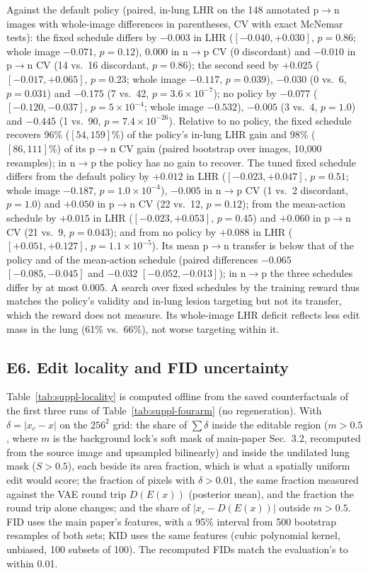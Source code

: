 Against the default policy (paired, in-lung LHR on the 148 annotated p$\to$n images with whole-image differences in parentheses, CV with exact McNemar tests): the fixed schedule differs by $-0.003$ in LHR ($[-0.040, +0.030]$, $p=0.86$; whole image $-0.071$, $p=0.12$), $0.000$ in n$\to$p CV (0 discordant) and $-0.010$ in p$\to$n CV (14 vs.\ 16 discordant, $p=0.86$); the second seed by $+0.025$ ($[-0.017, +0.065]$, $p=0.23$; whole image $-0.117$, $p=0.039$), $-0.030$ (0 vs.\ 6, $p=0.031$) and $-0.175$ (7 vs.\ 42, $p=3.6\times10^{-7}$); no policy by $-0.077$ ($[-0.120, -0.037]$, $p=5\times10^{-4}$; whole image $-0.532$), $-0.005$ (3 vs.\ 4, $p=1.0$) and $-0.445$ (1 vs.\ 90, $p=7.4\times10^{-26}$). Relative to no policy, the fixed schedule recovers 96\% ($[54, 159]\%$) of the policy's in-lung LHR gain and 98\% ($[86, 111]\%$) of its p$\to$n CV gain (paired bootstrap over images, 10{,}000 resamples); in n$\to$p the policy has no gain to recover. The tuned fixed schedule differs from the default policy by $+0.012$ in LHR ($[-0.023, +0.047]$, $p=0.51$; whole image $-0.187$, $p=1.0\times10^{-4}$), $-0.005$ in n$\to$p CV (1 vs.\ 2 discordant, $p=1.0$) and $+0.050$ in p$\to$n CV (22 vs.\ 12, $p=0.12$); from the mean-action schedule by $+0.015$ in LHR ($[-0.023, +0.053]$, $p=0.45$) and $+0.060$ in p$\to$n CV (21 vs.\ 9, $p=0.043$); and from no policy by $+0.088$ in LHR ($[+0.051, +0.127]$, $p=1.1\times10^{-5}$). Its mean p$\to$n transfer is below that of the policy and of the mean-action schedule (paired differences $-0.065$ $[-0.085, -0.045]$ and $-0.032$ $[-0.052, -0.013]$); in n$\to$p the three schedules differ by at most 0.005. A search over fixed schedules by the training reward thus matches the policy's validity and in-lung lesion targeting but not its transfer, which the reward does not measure. Its whole-image LHR deficit reflects less edit mass in the lung (61\% vs.\ 66\%), not worse targeting within it.

\subsection*{E6. Edit locality and FID uncertainty}
\label{sec:suppl-locality}

Table~\ref{tab:suppl-locality} is computed offline from the saved counterfactuals of the first three runs of Table~\ref{tab:suppl-fourarm} (no regeneration). With $\delta = |x_c - x|$ on the $256^2$ grid: the share of $\sum \delta$ inside the editable region ($m > 0.5$, where $m$ is the background lock's soft mask of main-paper Sec.~3.2, recomputed from the source image and upsampled bilinearly) and inside the undilated lung mask ($S > 0.5$), each beside its area fraction, which is what a spatially uniform edit would score; the fraction of pixels with $\delta > 0.01$, the same fraction measured against the VAE round trip $D(E(x))$ (posterior mean), and the fraction the round trip alone changes; and the share of $|x_c - D(E(x))|$ outside $m > 0.5$. FID uses the main paper's features, with a 95\% interval from 500 bootstrap resamples of both sets; KID uses the same features (cubic polynomial kernel, unbiased, 100 subsets of 100). The recomputed FIDs match the evaluation's to within 0.01.

